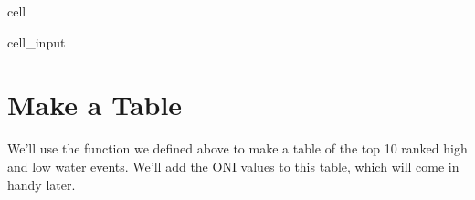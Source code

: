 \documentclass[letterpaper,10pt,english]{jupyterBook}
\begin{document}
\begin{sphinxuseclass}{cell}
\begin{sphinxVerbatimInput}
\begin{sphinxuseclass}{cell_input}
\begin{sphinxVerbatim}[commandchars=\\\{\}]
    \PYG{p}{[}\PYG{p}{]}  \PYG{p}{[}\PYG{p}{]}

     
\end{sphinxVerbatim}

\end{sphinxuseclass}\end{sphinxVerbatimInput}

\end{sphinxuseclass}

\part{Make a Table}
\label{\detokenize{notebooks/regional_and_local/SL_Rankings_annual:make-a-table}}
\sphinxAtStartPar
We’ll use the function we defined above to make a table of the top 10 ranked high and low water events. We’ll add the ONI values to this table, which will come in handy later.
\end{document}

